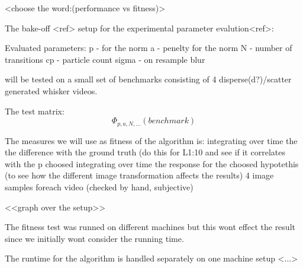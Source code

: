 
<choose the word:(performance vs fitness)>

The bake-off <ref> setup for the experimental parameter evalution<ref>:

Evaluated parameters:
    p     - for the norm
    a     - penelty for the norm
    N     - number of transitions
    cp    - particle count
    sigma - on resample blur

will be tested on a small set of benchmarks consisting of 4 disperse(d?)/scatter generated whisker videos.

The test matrix:
\begin{equation}
    \Phi_{p,a,N,...}(benchmark)
\end{equation}

The measures we will use as fitness of the algorithm is:
    integrating over time the the difference with the ground truth (do this for L{1:10} and see if it correlates with the p choosed
    integrating over time the response for the choosed hypotethis (to see how the different image transformation affects the results)
    4 image samples foreach video (checked by hand, subjective)

<<graph over the setup>>

The fitness test was runned on different machines but this wont effect the
result since we initially wont consider the running time.

The runtime for the algorithm is handled separately on one machine setup <...>

